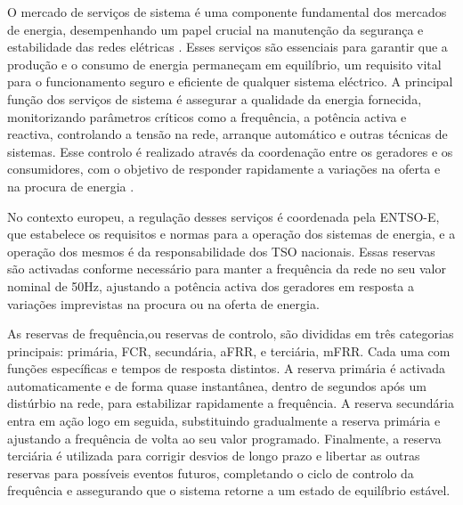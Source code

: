 
O mercado de serviços de sistema é uma componente fundamental dos mercados de energia, desempenhando um papel crucial na manutenção da segurança e estabilidade das redes elétricas \cite{dgegmss}. Esses serviços são essenciais para garantir que a produção e o consumo de energia permaneçam em equilíbrio, um requisito vital para o funcionamento seguro e eficiente de qualquer sistema eléctrico. A principal função dos serviços de sistema é assegurar a qualidade da energia fornecida, monitorizando parâmetros críticos como a frequência, a potência activa e reactiva, controlando a tensão na rede, arranque automático e outras técnicas de sistemas. Esse controlo é realizado através da coordenação entre os geradores e os consumidores, com o objetivo de responder rapidamente a variações na oferta e na procura de energia \cite{Rassid2017} \cite{Carneiro2016}.\par
No contexto europeu, a regulação desses serviços é coordenada pela \gls{ENTSO-E}, que estabelece os requisitos e normas para a operação dos sistemas de energia, e a operação dos mesmos é da responsabilidade dos \gls{TSO} nacionais. Essas reservas são activadas conforme necessário para manter a frequência da rede no seu valor nominal de 50Hz, ajustando a potência activa dos geradores em resposta a variações imprevistas na procura ou na oferta de energia.\par
As reservas de frequência,ou reservas de controlo, são divididas em três categorias principais: primária, \gls{FCR}, secundária, \gls{aFRR}, e terciária, \gls{mFRR}. Cada uma com funções específicas e tempos de resposta distintos. A reserva primária é activada automaticamente e de forma quase instantânea, dentro de segundos após um distúrbio na rede, para estabilizar rapidamente a frequência. A reserva secundária entra em ação logo em seguida, substituindo gradualmente a reserva primária e ajustando a frequência de volta ao seu valor programado. Finalmente, a reserva terciária é utilizada para corrigir desvios de longo prazo e libertar as outras reservas para possíveis eventos futuros, completando o ciclo de controlo da frequência e assegurando que o sistema retorne a um estado de equilíbrio estável.\par
